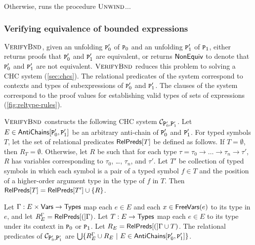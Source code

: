 Otherwise, \chkindaux runs the procedure $\textsc{Unwind}$...

\subsubsection{Verifying equivalence of bounded expressions}
\label{sec:verify-ders}
$\textsc{VerifyBnd}$, given an unfolding $\cc{P}_0'$ of $\cc{P}_0$ and
an unfolding $\cc{P}_1'$ of $\cc{P}_1$, either returns proofs that
$\cc{P}_0'$ and $\cc{P}_1'$ are equivalent, or returns $\mathsf{NonEquiv}$ to
denote that $\cc{P}_0'$ and $\cc{P}_1'$ are not equivalent.
%
$\textsc{VerifyBnd}$ reduces this problem to solving a CHC system
(\autoref{sec:chcs}).
%
The relational predicates of the system correspond to contexts and
types of subexpressions of $\cc{P}_0'$ and $\cc{P}_1'$.
%
The clauses of the system correspond to the proof values for
establishing valid types of sets of expressions
(\autoref{fig:reltype-rules}).

$\textsc{VerifyBnd}$ constructs the following CHC system $\mathcal{C}_{
  \cc{P}_0', \cc{P}_1' }$.
Let $E \in \antichains{ \cc{P}_0' }{ \cc{P}_1' }$ be an arbitrary
anti-chain of $\cc{P}_0'$ and $\cc{P}_1'$.
For typed symbols $T$, let the set of relational predicates
$\mathsf{RelPreds}[ T ]$ be defined as follows.
If $T = \emptyset$, then $R_T = \emptyset$.
Otherwise, let $R$ be such that for each type $\tau = \tau_0
\rightarrow \ldots \rightarrow \tau_n \rightarrow \tau'$, $R$ has
variables corresponding to $\tau_0$, \ldots, $\tau_n$, and $\tau'$.
%
Let $T'$ be collection of typed symbols in which each symbol is a pair
of a typed symbol $f \in T$ and the position of a higher-order
argument type in the type of $f$ in $T$.
%
Then $\mathsf{RelPreds}[ T ] = \mathsf{RelPreds}[  T'  ]  \cup \{  R  \}$.

Let $\Gamma : E \times \mathsf{Vars} \to \mathsf{Types}$ map each $e \in E$ and each
$x \in \mathsf{FreeVars}(e)$ to its type in $e$, and let $R_E^{\Gamma} =
\mathsf{RelPreds}[ ( ]\Gamma)$.
%
Let $T: E \to \mathsf{Types}$ map each $e \in E$ to its type under its context
in $\cc{P}_0$ or $\cc{P}_1$.
%
%
Let $R_E = \mathsf{RelPreds}[ ( ]\Gamma \cup T)$.
%
The relational predicates of $\mathcal{C}_{ \cc{P}_0', \cc{P}_1' }$
are $\bigunion \setformer{ R_E^{\Gamma} \union R_E }{ E \in
  \antichains{ \cc{P}_0' }{ \cc{P}_1' }}$.

